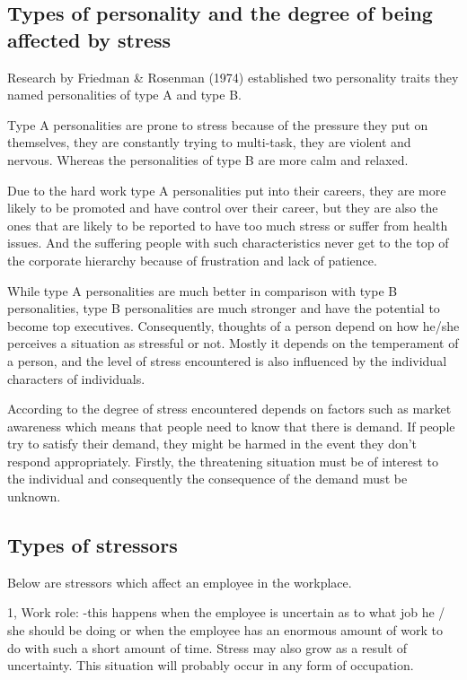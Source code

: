\subsection{Types of personality and the degree of being affected by stress} 
Research by Friedman \& Rosenman (1974) established two personality traits they named personalities of type A and type B.  

Type A personalities are prone to stress because of the pressure they put on themselves, they are constantly trying to multi-task, they are violent and nervous. Whereas the personalities of type B are more calm and relaxed.

Due to the hard work type A personalities put into their careers, they are more likely to be promoted and have control over their career, but they are also the ones that are likely to be reported to have too much stress or suffer from health issues. And the suffering people with such characteristics never get to the top of the corporate hierarchy because of frustration and lack of patience.

While type A personalities are much better in comparison with type B personalities, type B personalities are much stronger and have the potential to become top executives. Consequently, thoughts of a person depend on how he/she perceives a situation as stressful or not.  Mostly it depends on the temperament of a person, and the level of stress encountered is also influenced by the individual characters of individuals. \citep[p.314]{Bloisi2007ManagementBehaviour}

According to \cite{LazarusR.S.Folkman1984StressCoping.} the degree of stress encountered depends on factors such as market awareness which means that people need to know that there is demand. If people try to satisfy their demand, they might be harmed in the event they don't respond appropriately. Firstly, the threatening situation must be of interest to the individual and consequently the consequence of the demand must be unknown. \citep[p.310]{Bloisi2007ManagementBehaviour}

\subsection{Types of stressors}
Below are stressors which affect an employee in the workplace. 

1, Work role: -this happens when the employee is uncertain as to what job he / she should be doing or when the employee has an enormous amount of work to do with such a short amount of time. Stress may also grow as a result of uncertainty.  This situation will probably occur in any form of occupation.

